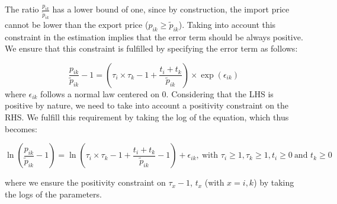 \documentclass[a4paper,11pt]{article}
\begin{document}
The ratio $\frac{p_{ik}}{\widetilde{p}_{ik}}$ has a lower bound of one, since by construction, the import price cannot be lower than the export price ($p_{ik}\geq\widetilde{p}_{ik}$). Taking into account this constraint in the estimation implies that the error term should be always positive.
We ensure that this constraint is fulfilled by specifying the error term as follows:

\begin{equation*}
\frac{p_{ik}}{\widetilde{p}_{ik}}-1 =\left(\tau_{i}\times \tau_{k} -1+\frac{t_{i} + t_{k}}{\widetilde{p}_{ik}} \right)\times \exp(\epsilon_{ik})
\end{equation*}
\noindent where $\epsilon_{ik}$ follows a normal law centered on 0. Considering that the LHS is positive by nature, we need to take into account a positivity constraint on the RHS. We fulfill this requirement by taking the log of the equation, which thus becomes:

\begin{equation}
\ln\left(\frac{p_{ik}}{\widetilde{p}_{ik}}-1 \right)= \ln \left(\tau_{i}\times \tau_{k} -1+\frac{t_{i} + t_{k}}{\widetilde{p}_{ik}}-1 \right) + \epsilon_{ik}, ~\text{with } \tau_{i}\geq 1, \tau_{k}\geq 1, t_{i}\geq 0  ~\text{and }t_{k}\geq 0  \label{eq:equation0}
\end{equation}

\noindent where we ensure the positivity constraint on $\tau_x-1$, $t_x$ (with $x =i,k$) by taking the logs of the parameters.
\end{document}
